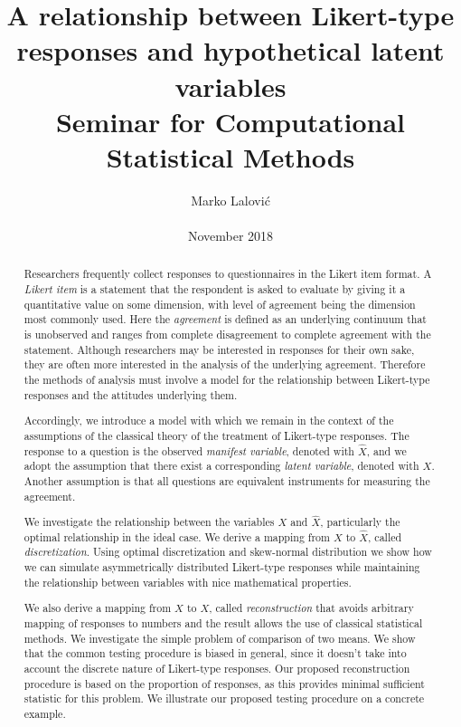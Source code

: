 \documentclass[10pt]{article}
\begin{document}
\title{A relationship between Likert-type responses and hypothetical latent variables\\
{\large Seminar for Computational Statistical Methods}}
\author{Marko Lalović \\
\\
November 2018 \\
}

\maketitle
\thispagestyle{empty}

\begin{abstract}
Researchers frequently collect responses to questionnaires in the Likert item format. A {\it Likert item} is a statement that the respondent is asked to evaluate by giving it a quantitative value on some dimension, with level of agreement being the dimension most commonly used. Here the {\it agreement} is defined as an underlying continuum that is unobserved and ranges from complete disagreement to complete agreement with the statement. Although researchers may be interested in responses for their own sake, they are often more interested in the analysis of the underlying agreement. Therefore the methods of analysis must involve a model for the relationship between Likert-type responses and the attitudes underlying them.

Accordingly, we introduce a model with which we remain in the context of the assumptions of the classical theory of the treatment of Likert-type responses. The response to a question is the observed {\it manifest variable}, denoted with $\hat{X}$, and we adopt the assumption that there exist a corresponding {\it latent variable}, denoted with $X$. Another assumption is that all questions are equivalent instruments for measuring the agreement.

We investigate the relationship between the variables $X$ and $\hat{X}$, particularly the optimal relationship in the ideal case. We derive a mapping from $X$ to $\hat{X}$, called {\it discretization}. Using optimal discretization and skew-normal distribution we show how we can simulate asymmetrically distributed Likert-type responses while maintaining the relationship between variables with nice mathematical properties. 

We also derive a mapping from $\hat{X}$ to $X$, called {\it reconstruction} that avoids arbitrary mapping of responses to numbers and the result allows the use of classical statistical methods. We investigate the simple problem of comparison of two means. We show that the common testing procedure is biased in general, since it doesn't take into account the discrete nature of Likert-type responses. Our proposed reconstruction procedure is based on the proportion of responses, as this provides minimal sufficient statistic for this problem. We illustrate our proposed testing procedure on a concrete example.
\end{abstract}
\end{document}
